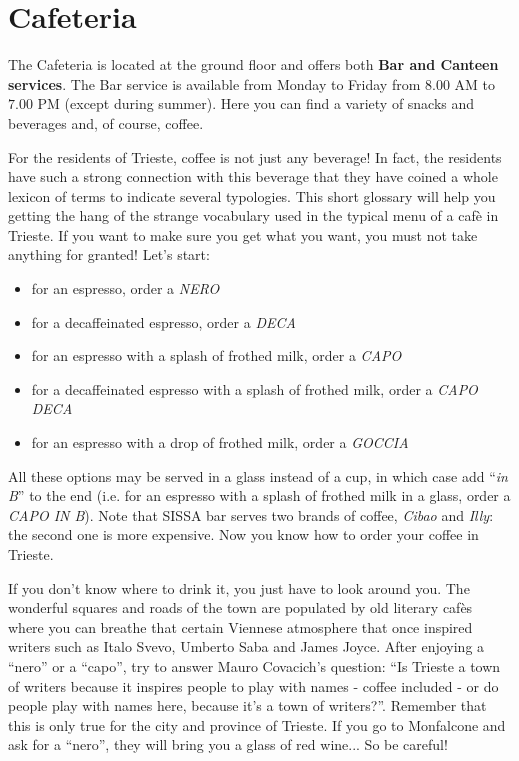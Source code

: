 \documentclass{sissavademecum}
\begin{document}
\section{Cafeteria}

The Cafeteria is located at the ground floor and offers both \textbf{Bar and Canteen services}. The Bar service is available from Monday to Friday from $8.00$ AM to $7.00$ PM (except during summer). Here you can find a variety of snacks and beverages and, of course, coffee. 

For the residents of Trieste, coffee is not just any beverage! In fact, the residents have such a strong connection with this beverage that they have coined a whole lexicon of terms to indicate several typologies. This short glossary will help you getting the hang of the strange vocabulary used in the typical menu of a caf\`e in Trieste. If you want to make sure you get what you want, you must not take anything for granted! Let's start:

\begin{itemize}
    \item for an espresso, order a \textit{NERO}
    \item for a decaffeinated espresso, order a \textit{DECA}
    \item for an espresso with a splash of frothed milk, order a \textit{CAPO}
    \item for a decaffeinated espresso with a splash of frothed milk, order a \textit{CAPO DECA}
    \item for an espresso with a drop of frothed milk, order a \textit{GOCCIA}
\end{itemize}

All these options may be served in a glass instead of a cup, in which case add ``\textit{in B}{}'' to the end (i.e. for an espresso with a splash of frothed milk in a glass, order a \textit{CAPO IN B}). Note that SISSA bar serves two brands of coffee, \textit{Cibao} and \textit{Illy}: the second one is more expensive. Now you know how to order your coffee in Trieste. 

If you don't know where to drink it, you just have to look around you. The wonderful squares and roads of the town are populated by old literary caf\`es where you can breathe that certain Viennese atmosphere that once inspired writers such as Italo Svevo, Umberto Saba and James Joyce. After enjoying a ``nero'' or a ``capo'', try to answer Mauro Covacich's question: ``Is Trieste a town of writers because it inspires people to play with names - coffee included - or do people play with names here, because it's a town of writers?''. Remember that this is only true for the city and province of Trieste. If you go to Monfalcone and ask for a ``nero'', they will bring you a glass of red wine... So be careful!
\end{document}
